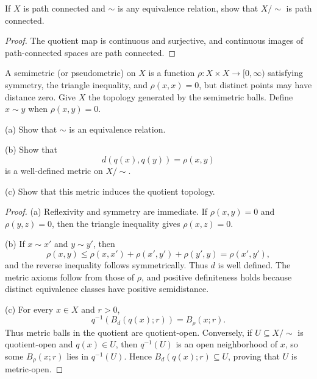 \begin{ex}
If $X$ is path connected and $\sim$ is any equivalence relation, show that
$X/\!\sim$ is path connected.
\end{ex}

\begin{proof}
The quotient map is continuous and surjective, and continuous images of
path-connected spaces are path connected.
\end{proof}

\begin{ex}
A semimetric (or pseudometric) on $X$ is a function
$\rho:X\times X\to[0,\infty)$ satisfying symmetry, the triangle inequality,
and $\rho(x,x)=0$, but distinct points may have distance zero. Give $X$ the
topology generated by the semimetric balls. Define $x\sim y$ when
$\rho(x,y)=0$.

(a) Show that $\sim$ is an equivalence relation.

(b) Show that
\[
d(q(x),q(y))=\rho(x,y)
\]
is a well-defined metric on $X/\!\sim$.

(c) Show that this metric induces the quotient topology.
\end{ex}

\begin{proof}
(a) Reflexivity and symmetry are immediate. If $\rho(x,y)=0$ and
$\rho(y,z)=0$, then the triangle inequality gives $\rho(x,z)=0$.

(b) If $x\sim x'$ and $y\sim y'$, then
\[
\rho(x,y)\leq\rho(x,x')+\rho(x',y')+\rho(y',y)=\rho(x',y'),
\]
and the reverse inequality follows symmetrically. Thus $d$ is well defined.
The metric axioms follow from those of $\rho$, and positive definiteness holds
because distinct equivalence classes have positive semidistance.

(c) For every $x\in X$ and $r>0$,
\[
q^{-1}(B_d(q(x);r))=B_\rho(x;r).
\]
Thus metric balls in the quotient are quotient-open. Conversely, if
$U\subseteq X/\!\sim$ is quotient-open and $q(x)\in U$, then
$q^{-1}(U)$ is an open neighborhood of $x$, so some
$B_\rho(x;r)$ lies in $q^{-1}(U)$. Hence
$B_d(q(x);r)\subseteq U$, proving that $U$ is metric-open.
\end{proof}
